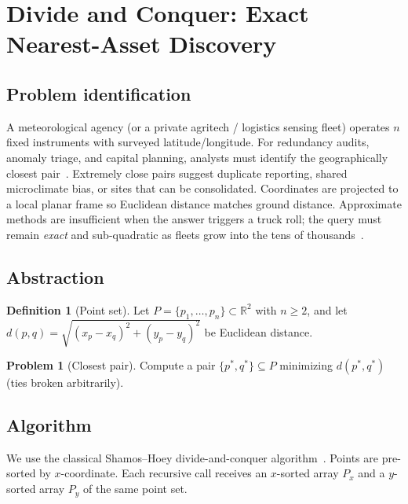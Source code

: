 \documentclass[sigconf,review=false]{acmart}
\theoremstyle{definition}
\newtheorem{definition}[theorem]{Definition}
\newtheorem{problem}[theorem]{Problem}
\begin{document}
\section{Divide and Conquer: Exact Nearest-Asset Discovery}
\label{sec:dac}

\subsection{Problem identification}
\label{sec:dac-id}

A meteorological agency (or a private agritech / logistics sensing fleet)
operates $n$ fixed instruments with surveyed latitude/longitude. For
redundancy audits, anomaly triage, and capital planning, analysts must
identify the geographically closest pair~\cite{noaa2020}. Extremely close
pairs suggest duplicate reporting, shared microclimate bias, or sites that
can be consolidated. Coordinates are projected to a local planar frame so
Euclidean distance matches ground distance. Approximate methods are
insufficient when the answer triggers a truck roll; the query must remain
\emph{exact} and sub-quadratic as fleets grow into the tens of
thousands~\cite{deberg2008}.

\subsection{Abstraction}
\label{sec:dac-abs}

\begin{definition}[Point set]
Let $P=\{p_1,\ldots,p_n\}\subset\mathbb{R}^2$ with $n\ge 2$, and let
$d(p,q)=\sqrt{(x_p-x_q)^2+(y_p-y_q)^2}$ be Euclidean distance.
\end{definition}

\begin{problem}[Closest pair]
Compute a pair $\{p^*,q^*\}\subseteq P$ minimizing $d(p^*,q^*)$
(ties broken arbitrarily).
\end{problem}

\subsection{Algorithm}
\label{sec:dac-alg}

We use the classical Shamos--Hoey divide-and-conquer
algorithm~\cite{shamos1975,preparata1985,clrs2009,deberg2008}. Points are
pre-sorted by $x$-coordinate. Each recursive call receives an $x$-sorted
array $P_x$ and a $y$-sorted array $P_y$ of the same point set.
\end{document}
